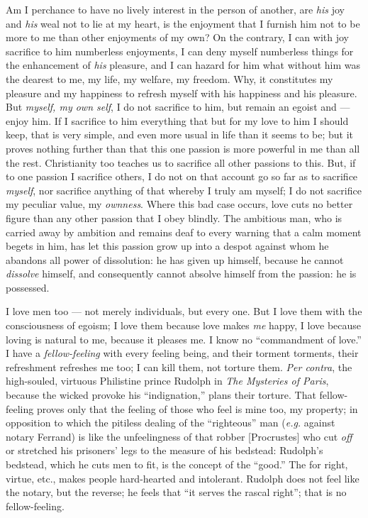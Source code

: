 Am I perchance to have no lively interest in the person of another, are 
\textit{his} joy and \textit{his} weal not to lie at my heart, is the 
enjoyment that I furnish him not to be more to me than other enjoyments of my 
own? On the contrary, I can with joy sacrifice to him numberless enjoyments, I 
can deny myself numberless things for the enhancement of \textit{his} 
pleasure, and I can hazard for him what without him was the dearest to me, my 
life, my welfare, my freedom. Why, it constitutes my pleasure and my happiness 
to refresh myself with his happiness and his pleasure. But \textit{myself, my 
own self}, I do not sacrifice to him, but remain an egoist and --- enjoy him. 
If I sacrifice to him everything that but for my love to him I should keep, 
that is very simple, and even more usual in life than it seems to be; but it 
proves nothing further than that this one passion is more powerful in me than 
all the rest. Christianity too teaches us to sacrifice all other passions to 
this. But, if to one passion I sacrifice others, I do not on that account go 
so far as to sacrifice \textit{myself}, nor sacrifice anything of that whereby 
I truly am myself; I do not sacrifice my peculiar value, my \textit{ownness}. 
Where this bad case occurs, love cuts no better figure than any other passion 
that I obey blindly. The ambitious man, who is carried away by ambition and 
remains deaf to every warning that a calm moment begets in him, has let this 
passion grow up into a despot against whom he abandons all power of 
dissolution: he has given up himself, because he cannot \textit{dissolve} 
himself, and consequently cannot absolve himself from the passion: he is 
possessed.

I love men too --- not merely individuals, but every one. But I love them with 
the consciousness of egoism; I love them because love makes \textit{me} happy, 
I love because loving is natural to me, because it pleases me. I know no 
``commandment of love.'' I have a \textit{fellow-feeling} with every feeling 
being, and their torment torments, their refreshment refreshes me too; I can 
kill them, not torture them. \textit{Per contra}, the high-souled, virtuous 
Philistine prince Rudolph in \textit{The Mysteries of Paris}, because the 
wicked provoke his ``indignation,'' plans their torture. That fellow-feeling 
proves only that the feeling of those who feel is mine too, my property; in 
opposition to which the pitiless dealing of the ``righteous'' man 
(\textit{e.g.} against notary Ferrand) is like the unfeelingness of that 
robber [Procrustes] who cut \textit{off} or stretched his prisoners' legs to 
the measure of his bedstead: Rudolph's bedstead, which he cuts men to fit, is 
the concept of the ``good.'' The for right, virtue, etc., makes people 
hard-hearted and intolerant. Rudolph does not feel like the notary, but the 
reverse; he feels that ``it serves the rascal right''; that is no 
fellow-feeling.


